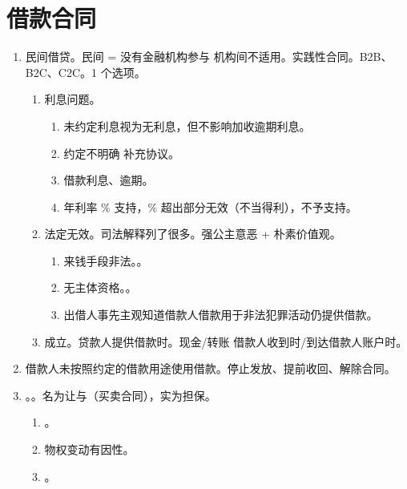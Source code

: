 \section{借款合同}
\begin{enumerate}
  \item 民间借贷。民间 = 没有金融机构参与 \yjt 机构间不适用。实践性合同。B2B、B2C、C2C。1 个选项。
        \begin{enumerate}
          \item 利息问题。
                \begin{enumerate}
                  \item 未约定利息视为无利息，但不影响加收逾期利息。
                  \item 约定不明确 \yjt 补充协议。
                  \item 借款利息、逾期。
                  \item 年利率 \% 支持，\% 超出部分无效（不当得利），不予支持。
                \end{enumerate}
          \item 法定无效。司法解释列了很多。强公主意恶 + 朴素价值观。
                \begin{enumerate}
                  \item 来钱手段非法。。
                  \item 无主体资格。。
                  \item 出借人事先主观知道借款人借款用于非法犯罪活动仍提供借款。
                \end{enumerate}
          \item 成立。贷款人提供借款时。现金/转账 \yjt 借款人收到时/到达借款人账户时。
        \end{enumerate}
  \item 借款人未按照约定的借款用途使用借款。停止发放、提前收回、解除合同。
  \item {}。。名为让与（买卖合同），实为担保。
        \begin{enumerate} 
          \item {}。
          \item {} \yjt 物权变动有因性。
          \item {}。

\end{enumerate}
\end{enumerate}
